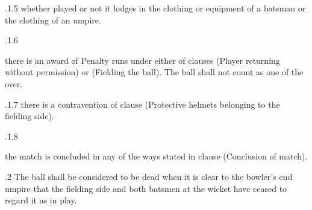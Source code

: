\documentclass[12pt]{article}
\begin{document}
\vspace{\baselineskip}
\begin{adjustwidth}{1.18in}{0.15in}
{\fontsize{9pt}{10.8pt}.1.5 \tabto{1.17in} whether played or not it lodges in the clothing or equipment of a batsman or the clothing of an umpire.\par}\par

\end{adjustwidth}


\vspace{\baselineskip}
\begin{adjustwidth}{1.18in}{0.53in}
{\fontsize{9pt}{10.8pt}.1.6 \tabto{1.17in} {\fontsize{8pt}{9.6pt}\selectfont there is an award of Penalty runs under either of clauses (Player returning without permission) or (Fielding the ball). The ball shall not count as one of the over.\par}\par}\par

\end{adjustwidth}


\vspace{\baselineskip}
\begin{adjustwidth}{0.49in}{0.0in}
{\fontsize{9pt}{10.8pt}.1.7 \tabto{1.17in} there is a contravention of clause (Protective helmets belonging to the fielding side).\par}\par

\end{adjustwidth}


\vspace{\baselineskip}
\begin{adjustwidth}{0.49in}{0.0in}
{\fontsize{9pt}{10.8pt}.1.8 \tabto{1.17in} {\fontsize{8pt}{9.6pt}\selectfont the match is concluded in any of the ways stated in clause (Conclusion of match).\par}\par}\par

\end{adjustwidth}


\vspace{\baselineskip}
\begin{adjustwidth}{0.5in}{0.07in}
{\fontsize{9pt}{10.8pt}.2 \tabto{0.49in} The ball shall be considered to be dead when it is clear to the bowler’s end umpire that the fielding side and both batsmen at the wicket have ceased to regard it as in play.\par}\par

\end{adjustwidth}
\end{document}
